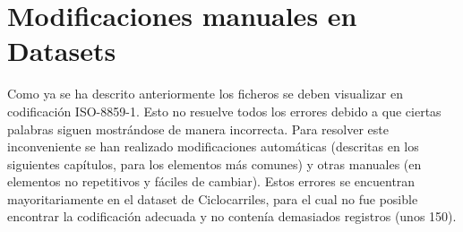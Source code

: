 
\section{Modificaciones manuales en Datasets}

Como ya se ha descrito anteriormente los ficheros se deben visualizar en codificación ISO-8859-1. Esto no resuelve todos los errores debido a que ciertas palabras siguen mostrándose de manera incorrecta. Para resolver este inconveniente se han realizado modificaciones automáticas (descritas en los siguientes capítulos, para los elementos más comunes) y otras manuales (en elementos no repetitivos y fáciles de cambiar). Estos errores se encuentran mayoritariamente en el dataset de Ciclocarriles, para el cual no fue posible encontrar la codificación adecuada y no contenía demasiados registros (unos 150).
\newline

